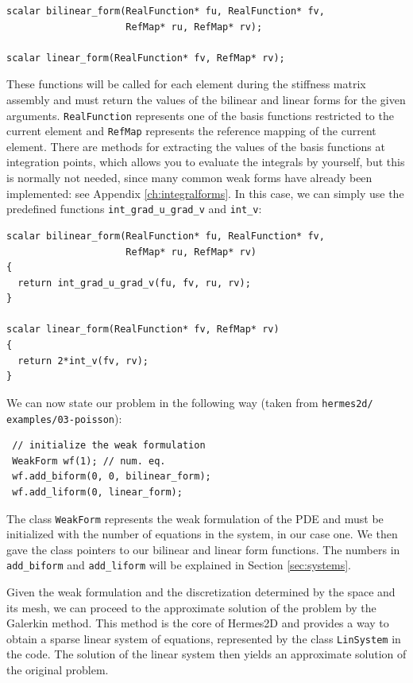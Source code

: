\begin{lstlisting}
scalar bilinear_form(RealFunction* fu, RealFunction* fv,
                     RefMap* ru, RefMap* rv);

scalar linear_form(RealFunction* fv, RefMap* rv);
\end{lstlisting}

These functions will be called for each element during the stiffness matrix
assembly and must return the values of the bilinear and linear forms for the given arguments.
{\tt RealFunction} represents one of the basis functions restricted to the
current element and {\tt RefMap} represents the reference mapping of the current element.
There are methods for extracting the values of the basis functions at integration points,
which allows you to evaluate the integrals by yourself, but this is normally not needed,
since many common weak forms have already been implemented: see Appendix
\ref{ch:integralforms}. In this case, we can simply use the predefined functions
\verb"int_grad_u_grad_v" and \verb"int_v":

\begin{lstlisting}
scalar bilinear_form(RealFunction* fu, RealFunction* fv,
                     RefMap* ru, RefMap* rv)
{
  return int_grad_u_grad_v(fu, fv, ru, rv);
}

scalar linear_form(RealFunction* fv, RefMap* rv)
{
  return 2*int_v(fv, rv);
}
\end{lstlisting}


We can now state our problem in the following way
(taken from {\tt hermes2d/ examples/03-poisson}):

\begin{lstlisting}
 // initialize the weak formulation
 WeakForm wf(1); // num. eq.
 wf.add_biform(0, 0, bilinear_form);
 wf.add_liform(0, linear_form);
\end{lstlisting}

The class {\tt WeakForm} represents the weak formulation of the PDE and must be
initialized with the number of equations in the system, in our case one. We then
gave the class pointers to our bilinear and linear form functions.
The numbers in {\tt add\_biform} and {\tt add\_liform} will be explained in 
Section \ref{sec:systems}.

Given the weak formulation and the discretization determined by the space and its mesh,
we can proceed to the approximate solution of the problem by the Galerkin method.
This method is the core of Hermes2D and provides a way to obtain a sparse linear
system of equations, represented by the class {\tt LinSystem} in the code. The solution
of the linear system then yields an approximate solution of the original problem.

